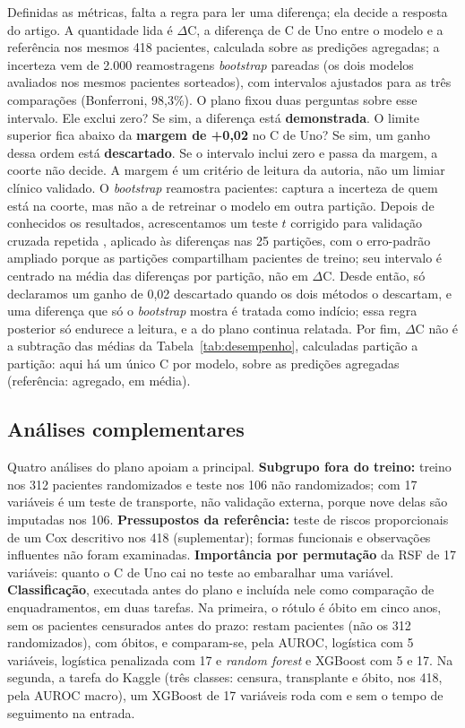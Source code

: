 \documentclass[12pt]{article}
\begin{document}
Definidas as métricas, falta a regra para ler uma diferença; ela decide a resposta do artigo. A quantidade lida é $\Delta$C, a diferença de C de Uno entre o modelo e a referência nos mesmos 418 pacientes, calculada sobre as predições agregadas; a incerteza vem de 2.000 reamostragens \textit{bootstrap} pareadas (os dois modelos avaliados nos mesmos pacientes sorteados), com intervalos ajustados para as três comparações (Bonferroni, 98,3\%). O plano fixou duas perguntas sobre esse intervalo. Ele exclui zero? Se sim, a diferença está \textbf{demonstrada}. O limite superior fica abaixo da \textbf{margem de +0,02} no C de Uno? Se sim, um ganho dessa ordem está \textbf{descartado}. Se o intervalo inclui zero e passa da margem, a coorte não decide. A margem é um critério de leitura da autoria, não um limiar clínico validado. O \textit{bootstrap} reamostra pacientes: captura a incerteza de quem está na coorte, mas não a de retreinar o modelo em outra partição. Depois de conhecidos os resultados, acrescentamos um teste $t$ corrigido para validação cruzada repetida \cite{nadeau2003inference}, aplicado às diferenças nas 25 partições, com o erro-padrão ampliado porque as partições compartilham pacientes de treino; seu intervalo é centrado na média das diferenças por partição, não em $\Delta$C. Desde então, só declaramos um ganho de 0,02 descartado quando os dois métodos o descartam, e uma diferença que só o \textit{bootstrap} mostra é tratada como indício; essa regra posterior só endurece a leitura, e a do plano continua relatada. Por fim, $\Delta$C não é a subtração das médias da Tabela~\ref{tab:desempenho}, calculadas partição a partição: aqui há um único C por modelo, sobre as predições agregadas (referência:  agregado,  em média).

\subsection{Análises complementares}\label{subsec:complementares}

Quatro análises do plano apoiam a principal. \textbf{Subgrupo fora do treino:} treino nos 312 pacientes randomizados e teste nos 106 não randomizados; com 17 variáveis é um teste de transporte, não validação externa, porque nove delas são imputadas nos 106. \textbf{Pressupostos da referência:} teste de riscos proporcionais \cite{grambsch1994ph} de um Cox descritivo nos 418 (suplementar); formas funcionais e observações influentes não foram examinadas. \textbf{Importância por permutação} da RSF de 17 variáveis: quanto o C de Uno cai no teste ao embaralhar uma variável. \textbf{Classificação}, executada antes do plano e incluída nele como comparação de enquadramentos, em duas tarefas. Na primeira, o rótulo é óbito em cinco anos, sem os pacientes censurados antes do prazo: restam \classifN{} pacientes (não os 312 randomizados), com \classifEventos{} óbitos, e comparam-se, pela AUROC, logística com 5 variáveis, logística penalizada com 17 e \textit{random forest} e XGBoost com 5 e 17. Na segunda, a tarefa do Kaggle (três classes: censura, transplante e óbito, nos 418, pela AUROC macro), um XGBoost de 17 variáveis roda com e sem o tempo de seguimento na entrada.
\end{document}
